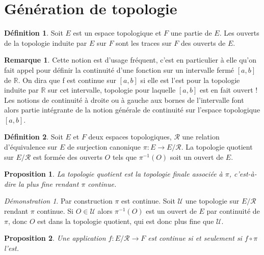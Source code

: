 \documentclass[a4paper, 11pt, french]{book}
\theoremstyle{plain} %
\newtheorem{proposition}{Proposition}
\theoremstyle{definition} %
\newtheorem{definition}{Définition}
\newtheorem{remarque}{Remarque}
\theoremstyle{remark} %
\newtheorem*{demonstration}{Démonstration}
\newcommand{\1}{\mathds{1}}
\newcommand{\inv}[1]{#1^{-1}}
\newcommand{\R}{\mathbb{R}}
\newcommand{\scr}[1]{\mathscr{#1}}
\begin{document}
\section{Génération de topologie}

\begin{definition}
	Soit $E$ est un espace topologique et $F$ une partie de $E$.
	Les ouverts de la topologie induite par $E$ sur $F$ sont les traces sur $F$ des ouverts de $E$.
\end{definition}

\begin{remarque}
	Cette notion est d’usage fréquent, c’est en particulier à elle qu’on fait appel pour définir la continuité d’une fonction sur un intervalle fermé $[a, b]$ de $\R$.
	On dira que f est continue sur $[a, b]$ si elle est l’est pour la topologie induite par $\R$ sur cet intervalle, topologie pour laquelle $[a, b]$ est en fait ouvert !
	Les notions de continuité à droite ou à gauche aux bornes de l’intervalle font alors partie intégrante de la notion générale de continuité sur l’espace topologique $[a, b]$.
\end{remarque}

\begin{definition}
	Soit $E$ et $F$ deux espaces topologiques, $\mathcal{R}$ une relation d’équivalence sur $E$ de surjection canonique $\pi\colon E\rightarrow E/\mathcal{R}$.
	La topologie quotient sur $E/\mathcal{R}$ est formée des ouverts $O$ tels que $\inv{\pi}(O)$ soit un ouvert de $E$.
\end{definition}

\begin{proposition}
	La topologie quotient est la topologie finale associée à $\pi$, c'est-à-dire la plus fine rendant $\pi$ continue.
\end{proposition}

\begin{demonstration}
	Par construction $\pi$ est continue.
	Soit $\scr{U}$ une topologie sur $E/\mathcal{R}$ rendant $\pi$ continue.
	Si $O\in\scr{U}$ alors $\inv{\pi}(O)$ est un ouvert de $E$ par continuité de $\pi$, donc $O$ est dans la topologie quotient, qui est donc plus fine que $\scr{U}$.
\end{demonstration}

\begin{proposition}
	Une application $f\colon E/\mathcal{R}\rightarrow F$ est continue si et seulement si $f\circ\pi$ l'est.
\end{proposition}
\end{document}
